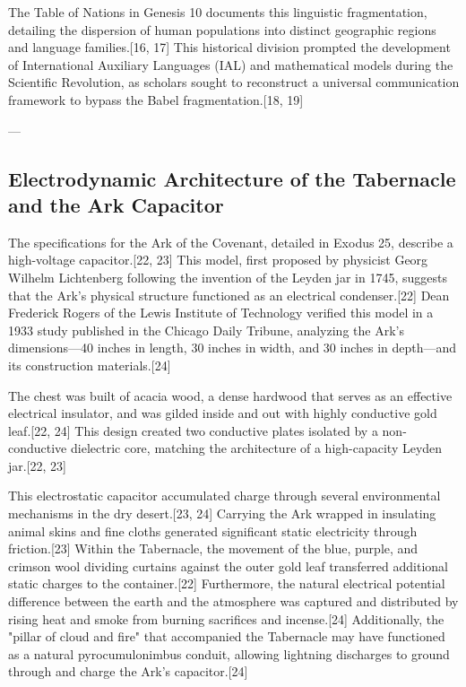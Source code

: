 \documentclass[aps,prd,11pt,onecolumn,superscriptaddress,nofootinbib,floatfix]{revtex4-2}
\begin{document}
The Table of Nations in Genesis 10 documents this linguistic fragmentation, detailing the dispersion of human populations into distinct geographic regions and language families.[16, 17] This historical division prompted the development of International Auxiliary Languages (IAL) and mathematical models during the Scientific Revolution, as scholars sought to reconstruct a universal communication framework to bypass the Babel fragmentation.[18, 19]


---


\subsection{Electrodynamic Architecture of the Tabernacle and the Ark Capacitor}
The specifications for the Ark of the Covenant, detailed in Exodus 25, describe a high-voltage capacitor.[22, 23] This model, first proposed by physicist Georg Wilhelm Lichtenberg following the invention of the Leyden jar in 1745, suggests that the Ark's physical structure functioned as an electrical condenser.[22] Dean Frederick Rogers of the Lewis Institute of Technology verified this model in a 1933 study published in the Chicago Daily Tribune, analyzing the Ark's dimensions---40 inches in length, 30 inches in width, and 30 inches in depth---and its construction materials.[24]


The chest was built of acacia wood, a dense hardwood that serves as an effective electrical insulator, and was gilded inside and out with highly conductive gold leaf.[22, 24] This design created two conductive plates isolated by a non-conductive dielectric core, matching the architecture of a high-capacity Leyden jar.[22, 23]


This electrostatic capacitor accumulated charge through several environmental mechanisms in the dry desert.[23, 24] Carrying the Ark wrapped in insulating animal skins and fine cloths generated significant static electricity through friction.[23] Within the Tabernacle, the movement of the blue, purple, and crimson wool dividing curtains against the outer gold leaf transferred additional static charges to the container.[22] Furthermore, the natural electrical potential difference between the earth and the atmosphere was captured and distributed by rising heat and smoke from burning sacrifices and incense.[24] Additionally, the "pillar of cloud and fire" that accompanied the Tabernacle may have functioned as a natural pyrocumulonimbus conduit, allowing lightning discharges to ground through and charge the Ark's capacitor.[24]
\end{document}
